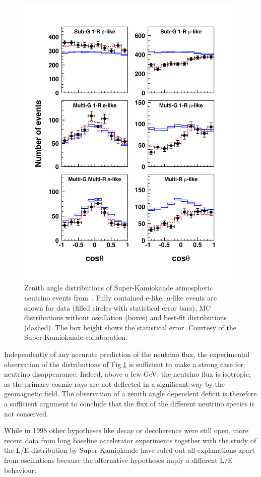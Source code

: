 \begin{figure}[htbp]
\centering
\includegraphics[width=0.8\linewidth]{figures/sk-2006-atm.pdf}
  \caption{Zenith angle distributions of Super-Kamiokande atmospheric neutrino events from~\cite{Hosaka:2006zd}. Fully contained
e-like, $\mu$-like events
are shown for data (filled circles with statistical
error bars), MC distributions without oscillation (boxes)
and
best-fit distributions (dashed). The box height shows the
statistical error. Courtesy of the Super-Kamiokande collaboration.}
 \label{fig:sk-atm}
 \end{figure}

Independently of any accurate prediction of the neutrino flux, the experimental observation of the distributions of Fig.\ref{fig:sk-atm} is sufficient to make a strong case for neutrino disappearance. Indeed, above a few GeV, the neutrino flux is isotropic, as the primary cosmic rays are not deflected in a significant way by the geomagnetic field. The observation of a zenith angle dependent deficit is therefore a sufficient argument to conclude that the flux of the different neutrino species is not conserved.  

While in 1998 other hypotheses like decay or decoherence were still open, more recent data from long baseline accelerator experiments together with the study of the L/E distribution by Super-Kamiokande have ruled out all explanations apart from oscillations because the alternative hypotheses imply a different L/E behaviour. 
    
